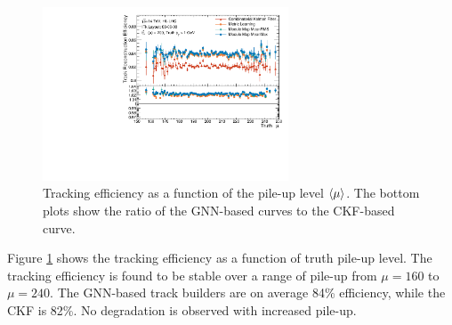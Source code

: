 
\begin{figure}[h]
    \centering
    \includegraphics[width=0.65\textwidth]{figures/ckf-gnn/Efficiency/efficiency_vs_truthMu.pdf}
    \caption{Tracking efficiency as a function of the pile-up level $\expval{\mu}$. The bottom plots show the ratio of the GNN-based curves to the CKF-based curve.}
    \label{fig:tracking-eff-mu}
\end{figure}
Figure \ref{fig:tracking-eff-mu} shows the tracking efficiency as a function of truth pile-up level.
The tracking efficiency is found to be stable over a range of pile-up from $\mu=160$ to $\mu=240$. 
The GNN-based track builders are on average 84\% efficiency, while the CKF is 82\%. 
No degradation is observed with increased pile-up.

